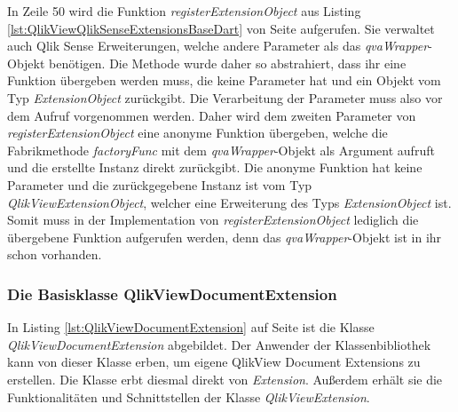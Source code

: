 In Zeile 50 wird die Funktion \textit{registerExtensionObject} aus Listing \ref{lst:QlikViewQlikSenseExtensionsBaseDart} von Seite \pageref{lst:QlikViewQlikSenseExtensionsBaseDart} aufgerufen. Sie verwaltet auch Qlik Sense Erweiterungen, welche andere Parameter als das \textit{qvaWrapper}-Objekt benötigen. Die Methode wurde daher so abstrahiert, dass ihr eine Funktion übergeben werden muss, die keine Parameter hat und ein Objekt vom Typ \textit{ExtensionObject} zurückgibt. Die Verarbeitung der Parameter muss also vor dem Aufruf vorgenommen werden. Daher wird dem zweiten Parameter von \textit{registerExtensionObject} eine anonyme Funktion übergeben, welche die Fabrikmethode \textit{factoryFunc} mit dem \textit{qvaWrapper}-Objekt als Argument aufruft und die erstellte Instanz direkt zurückgibt. Die anonyme Funktion hat keine Parameter und die zurückgegebene Instanz ist vom Typ \textit{QlikViewExtensionObject}, welcher eine Erweiterung des Typs \textit{ExtensionObject} ist. Somit muss in der Implementation von \textit{registerExtensionObject} lediglich die übergebene Funktion aufgerufen werden, denn das \textit{qvaWrapper}-Objekt ist in ihr schon vorhanden. 


\subsubsection{Die Basisklasse QlikViewDocumentExtension}
\label{lab:DieBasisklasseQlikViewDocumentExtension}

In Listing \ref{lst:QlikViewDocumentExtension} auf Seite \pageref{lst:QlikViewDocumentExtension} ist die Klasse \textit{QlikViewDocumentExtension} abgebildet. Der Anwender der Klassen\-bibliothek kann von dieser Klasse erben, um eigene QlikView Document Extensions zu erstellen. Die Klasse erbt diesmal direkt von \textit{Extension}. Außerdem erhält sie die Funktionalitäten und Schnittstellen der Klasse \textit{QlikViewExtension}.

